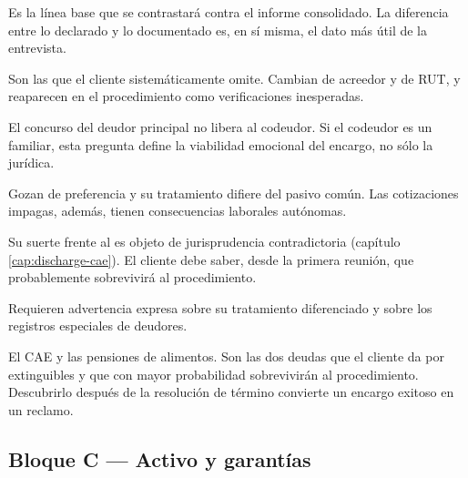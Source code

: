 \begin{cuestionario}
  {Es la línea base que se contrastará contra el informe consolidado. La diferencia entre
  lo declarado y lo documentado es, en sí misma, el dato más útil de la entrevista.}

  {Son las que el cliente sistemáticamente omite. Cambian de acreedor y de RUT, y
  reaparecen en el procedimiento como verificaciones inesperadas.}

  {El concurso del deudor principal no libera al codeudor. Si el codeudor es un familiar,
  esta pregunta define la viabilidad emocional del encargo, no sólo la jurídica.}

  {Gozan de preferencia y su tratamiento difiere del pasivo común. Las cotizaciones
  impagas, además, tienen consecuencias laborales autónomas.}

  {Su suerte frente al \discharge{} es objeto de jurisprudencia contradictoria
  (capítulo \ref{cap:discharge-cae}). El cliente debe saber, desde la primera reunión,
  que probablemente sobrevivirá al procedimiento.}

  {Requieren advertencia expresa sobre su tratamiento diferenciado y sobre los registros
  especiales de deudores.}
\end{cuestionario}

\begin{alerta}
El CAE y las pensiones de alimentos. Son las dos deudas que el cliente da por
extinguibles y que con mayor probabilidad sobrevivirán al procedimiento. Descubrirlo
después de la resolución de término convierte un encargo exitoso en un reclamo.
\end{alerta}

\subsection{Bloque C — Activo y garantías}

